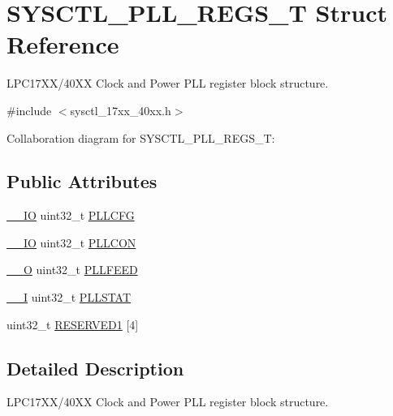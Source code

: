 \hypertarget{structSYSCTL__PLL__REGS__T}{}\section{S\+Y\+S\+C\+T\+L\+\_\+\+P\+L\+L\+\_\+\+R\+E\+G\+S\+\_\+T Struct Reference}
\label{structSYSCTL__PLL__REGS__T}


L\+P\+C17\+X\+X/40\+XX Clock and Power P\+LL register block structure.  




{\ttfamily \#include $<$sysctl\+\_\+17xx\+\_\+40xx.\+h$>$}



Collaboration diagram for S\+Y\+S\+C\+T\+L\+\_\+\+P\+L\+L\+\_\+\+R\+E\+G\+S\+\_\+T\+:
\subsection*{Public Attributes}
\begin{DoxyCompactItemize}
\item 
\hyperlink{core__cm3_8h_aec43007d9998a0a0e01faede4133d6be}{\+\_\+\+\_\+\+IO} uint32\+\_\+t \hyperlink{structSYSCTL__PLL__REGS__T_a7f6a92521303bcd5522acdac74af3210}{P\+L\+L\+C\+FG}
\item 
\hyperlink{core__cm3_8h_aec43007d9998a0a0e01faede4133d6be}{\+\_\+\+\_\+\+IO} uint32\+\_\+t \hyperlink{structSYSCTL__PLL__REGS__T_a1fb97445f7a92913133769bb098df316}{P\+L\+L\+C\+ON}
\item 
\hyperlink{core__cm3_8h_a7e25d9380f9ef903923964322e71f2f6}{\+\_\+\+\_\+O} uint32\+\_\+t \hyperlink{structSYSCTL__PLL__REGS__T_a658116aa66b1d9e27f12cf0e429663f7}{P\+L\+L\+F\+E\+ED}
\item 
\hyperlink{core__cm3_8h_af63697ed9952cc71e1225efe205f6cd3}{\+\_\+\+\_\+I} uint32\+\_\+t \hyperlink{structSYSCTL__PLL__REGS__T_a9cc1486fbc5a9888ccdd70df2b57ebec}{P\+L\+L\+S\+T\+AT}
\item 
uint32\+\_\+t \hyperlink{structSYSCTL__PLL__REGS__T_a8f564110c46a5fba4e6d306cd4137bd3}{R\+E\+S\+E\+R\+V\+E\+D1} \mbox{[}4\mbox{]}
\end{DoxyCompactItemize}


\subsection{Detailed Description}
L\+P\+C17\+X\+X/40\+XX Clock and Power P\+LL register block structure. 


